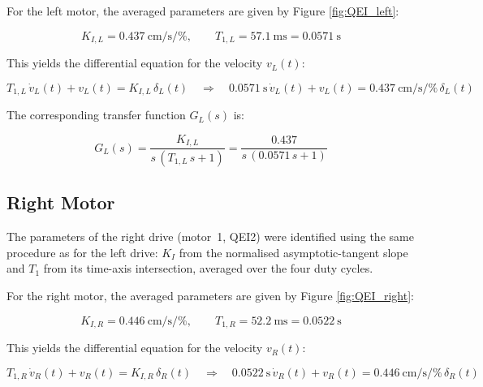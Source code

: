 \documentclass[12pt, oneside, a4paper]{scrreprt}
\begin{document}
            For the left motor, the averaged parameters are given by Figure \ref{fig:QEI_left}:

            \begin{equation}
                K_{I,L} = \qty{0.437}{\centi\metre\per\second\per\percent}, \qquad
                T_{1,L} = \qty{57.1}{\milli\second} = \qty{0.0571}{\second}
            \end{equation}

            This yields the differential equation for the velocity $v_L(t)$:

            \begin{equation}
                T_{1,L}\,\dot{v}_L(t) + v_L(t) = K_{I,L}\,\delta_L(t)
                \quad\Rightarrow\quad
                \qty{0.0571}{\second}\,\dot{v}_L(t) + v_L(t) = \qty{0.437}{\centi\metre\per\second\per\percent}\,\delta_L(t)
            \end{equation}

            The corresponding transfer function $G_L(s)$ is:

            \begin{equation}
                G_L(s) = \frac{K_{I,L}}{s\,(T_{1,L}\,s + 1)} = \frac{0.437}{s\,(0.0571\,s + 1)}
            \end{equation}


            \subsection{Right Motor}\label{subsec:right-motor}

            The parameters of the right drive (motor~1, QEI2) were identified using the same procedure as for the left drive: $K_I$ from the normalised asymptotic-tangent slope and $T_1$ from its time-axis intersection, averaged over the four duty cycles.

            For the right motor, the averaged parameters are given by Figure \ref{fig:QEI_right}:

            \begin{equation}
                K_{I,R} = \qty{0.446}{\centi\metre\per\second\per\percent}, \qquad
                T_{1,R} = \qty{52.2}{\milli\second} = \qty{0.0522}{\second}
            \end{equation}

            This yields the differential equation for the velocity $v_R(t)$:

            \begin{equation}
                T_{1,R}\,\dot{v}_R(t) + v_R(t) = K_{I,R}\,\delta_R(t)
                \quad\Rightarrow\quad
                \qty{0.0522}{\second}\,\dot{v}_R(t) + v_R(t) = \qty{0.446}{\centi\metre\per\second\per\percent}\,\delta_R(t)
            \end{equation}
\end{document}
